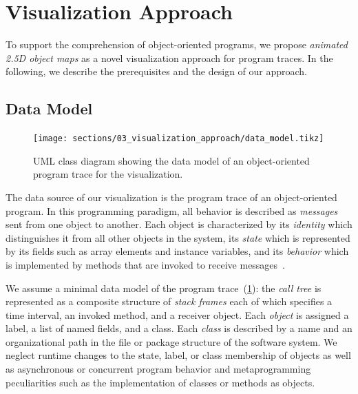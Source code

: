 \section{Visualization Approach}
\label{sec:visualization_approach}

To support the comprehension of object-oriented programs, we propose \emph{animated 2.5D object maps} as a novel visualization approach for program traces.
In the following, we describe the prerequisites and the design of our approach.

\subsection{Data Model}
\label{sec:visualization_approach/data_model}

\begin{figure}
	\texttt{[image: sections/03\_visualization\_approach/data\_model.tikz]}
	\caption{
		UML class diagram showing the data model of an object-oriented program trace for the visualization.
	}
	\label{fig:visualization_approach/data_model}
\end{figure}

The data source of our visualization is the program trace of an object-oriented program.
In this programming paradigm, all behavior is described as \emph{messages} sent from one object to another.
Each object is characterized by its \emph{identity} which distinguishes it from all other objects in the system, its \emph{state} which is represented by its fields such as array elements and instance variables, and its \emph{behavior} which is implemented by methods that are invoked to receive messages~\cite{thiede2023time}.

We assume a minimal data model of the program trace~(\cref{fig:visualization_approach/data_model}):
the \emph{call tree} is represented as a composite structure of \emph{stack frames} each of which specifies a time interval, an invoked method, and a receiver object.
Each \emph{object} is assigned a label, a list of named fields, and a class.
Each \emph{class} is described by a name and an organizational path in the file or package structure of the software system.
We neglect runtime changes to the state, label, or class membership of objects as well as asynchronous or concurrent program behavior and metaprogramming peculiarities such as the implementation of classes or methods as objects.

